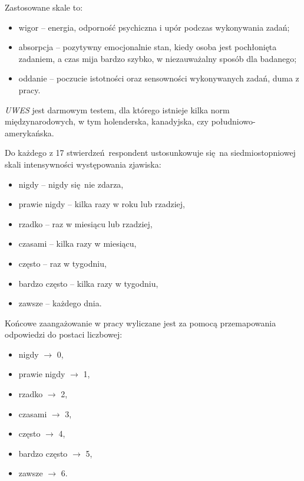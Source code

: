 Zastosowane skale to:
\begin{itemize}
\item wigor -- energia, odporność psychiczna i upór podczas wykonywania zadań;
\item absorpcja -- pozytywny emocjonalnie stan, kiedy osoba jest pochłonięta zadaniem, a czas mija bardzo szybko, w niezauważalny sposób dla badanego;
\item oddanie -- poczucie istotności oraz sensowności wykonywanych zadań, duma z pracy.
\end{itemize}

\emph{UWES} jest darmowym testem, dla którego istnieje kilka norm międzynarodowych, w tym holenderska, kanadyjska, czy południowo-amerykańska. 

Do każdego z 17 stwierdzeń respondent ustosunkowuje się na siedmiostopniowej skali intensywności występowania zjawiska:
\begin{itemize}
\item nigdy -- nigdy się nie zdarza,
\item prawie nigdy -- kilka razy w roku lub rzadziej,
\item rzadko -- raz w miesiącu lub rzadziej,
\item czasami -- kilka razy w miesiącu,
\item często -- raz w tygodniu,
\item bardzo często -- kilka razy w tygodniu,
\item zawsze -- każdego dnia.
\end{itemize}

Końcowe zaangażowanie w pracy wyliczane jest za pomocą przemapowania odpowiedzi do postaci liczbowej:
\begin{itemize}
\item nigdy $\rightarrow$ 0,
\item prawie nigdy $\rightarrow$ 1,
\item rzadko $\rightarrow$ 2,
\item czasami $\rightarrow$ 3,
\item często $\rightarrow$ 4,
\item bardzo często $\rightarrow$ 5,
\item zawsze $\rightarrow$ 6.
\end{itemize}

